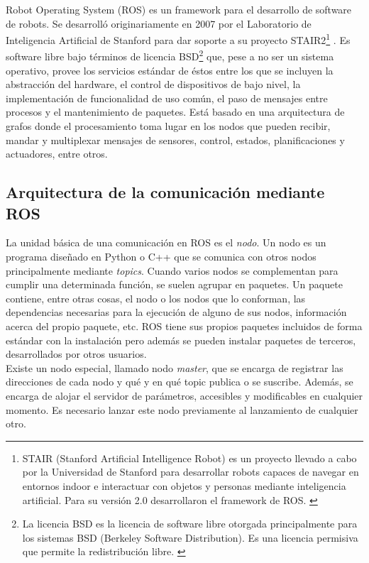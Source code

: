 Robot Operating System (ROS) es un framework para el desarrollo de software de robots. Se desarrolló originariamente en 2007 por el Laboratorio de Inteligencia Artificial de Stanford para dar soporte a su proyecto STAIR2\footnote{STAIR (Stanford Artificial Intelligence Robot) es un proyecto llevado a cabo por la Universidad de Stanford para desarrollar robots capaces de navegar en entornos indoor e interactuar con objetos y personas mediante inteligencia artificial. Para su versión 2.0 desarrollaron el framework de ROS. \cite{stair}} \cite{stair_paper}. Es software libre bajo términos de licencia BSD\footnote{La licencia BSD es la licencia de software libre otorgada principalmente para los sistemas BSD (Berkeley Software Distribution). Es una licencia permisiva que permite la redistribución libre. \cite{licencia}} que, pese a no ser un sistema operativo, provee los servicios estándar de éstos entre los que se incluyen la abstracción del hardware, el control de dispositivos de bajo nivel, la implementación de funcionalidad de uso común, el paso de mensajes entre procesos y el mantenimiento de paquetes. Está basado en una arquitectura de grafos donde el procesamiento toma lugar en los nodos que pueden recibir, mandar y multiplexar mensajes de sensores, control, estados, planificaciones y actuadores, entre otros.\\


\subsection{Arquitectura de la comunicación mediante ROS}

La unidad básica de una comunicación en ROS es el \textit{nodo}. Un nodo es un programa diseñado en Python o C++ que se comunica con otros nodos principalmente mediante \textit{topics}. Cuando varios nodos se complementan para cumplir una determinada función, se suelen agrupar en paquetes. Un paquete contiene, entre otras cosas, el nodo o los nodos que lo conforman, las dependencias necesarias para la ejecución de alguno de sus nodos, información acerca del propio paquete, etc. ROS tiene sus propios paquetes incluidos de forma estándar con la instalación pero además se pueden instalar paquetes de terceros, desarrollados por otros usuarios.\\

Existe un nodo especial, llamado nodo \textit{master}, que se encarga de registrar las direcciones de cada nodo y qué y en qué topic publica o se suscribe. Además, se encarga de alojar el servidor de parámetros, accesibles y modificables en cualquier momento. Es necesario lanzar este nodo previamente al lanzamiento de cualquier otro. \\

